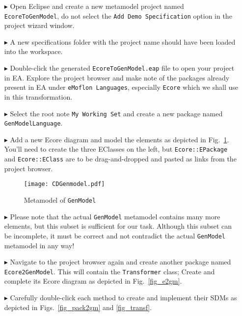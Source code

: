 \begin{enumerate}

\item[$\blacktriangleright$] Open Eclipse and create a new metamodel project named \texttt{Ecore\-To\-Gen\-Model}, do not select the \texttt{Add Demo Specification}
option in the project wizard window.

\item[$\blacktriangleright$] A new specifications folder with the project name should have been loaded into the workspace.

\item[$\blacktriangleright$] Double-click the generated \texttt{Ecore\-To\-Gen\-Model.eap} file to open your project in EA. 
Explore the project browser and make note of the packages already present in EA under \texttt{eMoflon Languages}, especially \texttt{Ecore} which we shall use in this transformation.

\item[$\blacktriangleright$] Select the root note \texttt{My Working Set} and create a new package named \texttt{Gen\-Model\-Language}. 

\item[$\blacktriangleright$] Add a new Ecore diagram and model the elements as depicted in Fig.~\ref{fig_gMM}. You'll need to create the three EClasses on
the left, but \texttt{Ecore::EPackage} and \texttt{Ecore::EClass} are to be drag-and-dropped and pasted as links from the project browser. 

\vspace{0.5cm}

\begin{figure}[htbp]
\begin{center}  
	\texttt{[image: CDGenmodel.pdf]}
	\caption{Metamodel of \texttt{GenModel}}  
\label{fig_gMM}
\end{center}
\end{figure} 

\vspace{0.5cm}

\item[$\blacktriangleright$] Please note that the actual \texttt{GenModel} metamodel contains many more elements, but this subset is sufficient for our
task.
Although this subset can be incomplete, it must be correct and not contradict the actual \texttt{GenModel} metamodel in any way!

\item[$\blacktriangleright$] Navigate to the project browser again and create another package named \texttt{Ecore2GenModel}.  
This will contain the \texttt{Transformer} class; Create and complete its Ecore diagram as depicted in Fig.~\ref{fig_e2gm}.

\item[$\blacktriangleright$] Carefully double-click each method to create and implement their SDMs as depicted in Figs.~\ref{fig_pack2gm} and \ref{fig_transf}.
\end{enumerate}

